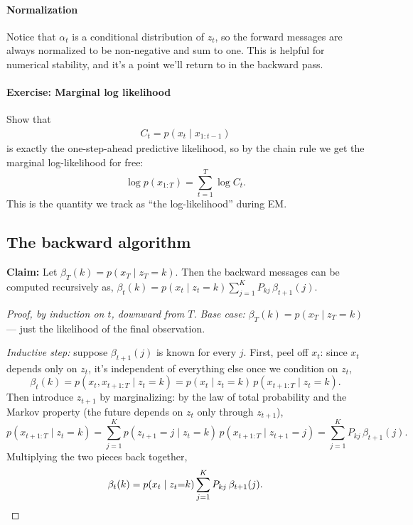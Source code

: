\documentclass[11pt]{article}
\begin{document}
\paragraph{Normalization}
Notice that $\alpha_t$ is a conditional distribution of $z_t$, 
so the forward messages are always normalized to be non-negative and sum to one.
This is helpful for numerical stability, and it's a point we'll return to in the 
backward pass. 

\paragraph{Exercise: Marginal log likelihood}
Show that 
\begin{align}
  C_t = p(x_t\mid x_{1:t-1})
\end{align} is exactly the one-step-ahead predictive likelihood, so by
the chain rule we get the marginal log-likelihood for free:
\begin{equation}
\log p(x_{1:T}) = \sum_{t=1}^T \log C_t.
\label{eq:marginal-lik-hmm}
\end{equation}
This is the quantity we track as ``the log-likelihood'' during EM.

\subsection{The backward algorithm}

\textbf{Claim:} Let $\beta_T(k) = p(x_T \mid z_T=k)$. Then the backward messages can be computed recursively as, $\displaystyle \beta_t(k) = p(x_t \mid z_t{=}k)
\sum_{j=1}^K P_{kj}\, \beta_{t+1}(j)$.

\begin{proof}[Proof, by induction on $t$, downward from $T$]
\textit{Base case:} $\beta_T(k) = p(x_T \mid z_T{=}k)$ --- just the
likelihood of the final observation.

\textit{Inductive step:} suppose $\beta_{t+1}(j)$ is known for every $j$.
First, peel off $x_t$: since $x_t$ depends only on $z_t$, it's independent
of everything else once we condition on $z_t$,
\[
\beta_t(k) = p(x_t, x_{t+1:T} \mid z_t{=}k)
= p(x_t \mid z_t{=}k)\, p(x_{t+1:T} \mid z_t{=}k).
\]
Then introduce $z_{t+1}$ by marginalizing: by the law of total probability
and the Markov property (the future depends on $z_t$ only through
$z_{t+1}$),
\[
p(x_{t+1:T} \mid z_t{=}k)
= \sum_{j=1}^K p(z_{t+1}{=}j \mid z_t{=}k)\, p(x_{t+1:T}\mid z_{t+1}{=}j)
= \sum_{j=1}^K P_{kj}\, \beta_{t+1}(j).
\]
Multiplying the two pieces back together,
\[
\beta_t(k) = p(x_t\mid z_t{=}k) \sum_{j=1}^K P_{kj}\,\beta_{t+1}(j). \qedhere
\]
\end{proof}
\end{document}
